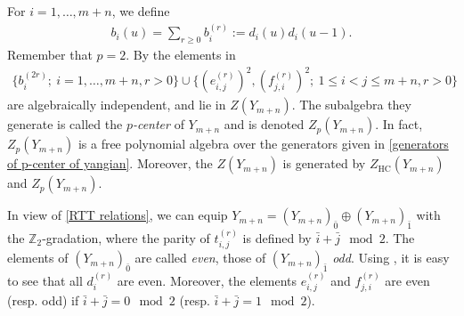 \documentclass[12pt,reqno]{amsart}
\newcommand{\ZZ}{\mathbb{Z}}
\DeclareMathOperator{\HC}{HC}
\numberwithin{equation}{section}
\theoremstyle{Theorem}
\theoremstyle{remark}
\numberwithin{equation}{section}
\begin{document}
For $i=1,\dots,m+n$, we define
\begin{align}\label{biu}
b_i(u)=\sum_{r\geq 0}b_i^{(r)}:=d_i(u)d_i(u-1).
\end{align}
Remember that $p=2$.
By \cite[Theorem 5.11(2)]{BT18} the elements in
\begin{align}\label{generators of p-center of yangian}
\{b_i^{(2r)};~i=1,\dots,m+n,r>0\}\cup\{(e_{i,j}^{(r)})^2, (f_{j,i}^{(r)})^2;~1\leq i<j\leq m+n, r>0\}   
\end{align}
are algebraically independent, and lie in $Z(Y_{m+n})$.
The subalgebra they generate is called the {\it $p$-center} of $Y_{m+n}$ and is denoted $Z_p(Y_{m+n})$.
In fact, $Z_p(Y_{m+n})$ is a free polynomial algebra over the generators given in \eqref{generators of p-center of yangian}.
Moreover,
the $Z(Y_{m+n})$ is generated by $Z_{\HC}(Y_{m+n})$ and $Z_p(Y_{m+n})$.

In view of \eqref{RTT relations}, we can equip $Y_{m+n}=(Y_{m+n})_{\bar 0}\oplus (Y_{m+n})_{\bar 1}$ with the $\ZZ_2$-gradation, where the parity of $t_{i,j}^{(r)}$ is defined by $\bar i+\bar j\mod 2$. The elements of $(Y_{m+n})_{\bar 0}$ are called {\it even}, those of $(Y_{m+n})_{\bar 1}$ {\it odd}.
Using \cite[(4.6)-(4.9)]{BT18}, it is easy to see that all $d_i^{(r)}$ are even.
Moreover, the elements $e_{i,j}^{(r)}$ and $f_{j,i}^{(r)}$ are even (resp. odd) if $\bar i+\bar j=0\mod 2$ (resp. $\bar i+\bar j=1\mod 2$).
\end{document}
